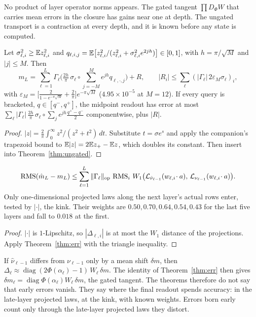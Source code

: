 No product of layer operator norms appears. The gated tangent $\prod D_\Phi W$ that carries mean errors in the closure
has gains near one at depth. The ungated transport is a contraction at every depth, and it is known before any state is
computed.

\begin{theorem}\label{thm:readout}
Let $\sigma_{\ell,i}^2\ge\mathbb{E} z_{\ell,i}^2$ and $q_{\ell,i,j}=\mathbb{E}\big[z_{\ell,i}^2/(z_{\ell,i}^2+\sigma_{\ell,i}^2e^{2jh})\big]
\in[0,1]$, with $h=\pi/\sqrt M$ and $|j|\le M$. Then
\[
m_L=\sum_{\ell=1}^L\Gamma_\ell\Big(\tfrac{2h}{\pi}\,\sigma_\ell\circ\sum_{j=-M}^Me^{jh}q_{\ell,\cdot,j}\Big)+R,\qquad
|R_i|\le\sum_\ell(|\Gamma_\ell|\,2\varepsilon_M\sigma_\ell)_i,
\]
with $\varepsilon_M=\big[\tfrac2{1-e^{-\pi\sqrt M}}+\tfrac2\pi\big]e^{-\pi\sqrt M}$ ($4.95\times10^{-5}$ at $M=12$). If every
query is bracketed, $q\in[q^-,q^+]$, the midpoint readout has error at most
$\sum_\ell|\Gamma_\ell|\,\frac{2h}{\pi}\,\sigma_\ell\circ\sum_je^{jh}\frac{q^+-q^-}2$ componentwise, plus $|R|$.
\end{theorem}
\begin{proof}
$|z|=\frac2\pi\int_0^\infty z^2/(z^2+t^2)\,dt$. Substitute $t=\sigma e^s$ and apply the companion's trapezoid bound to $\mathbb{E}|z|=2\mathbb{E}
z_+-\mathbb{E} z$, which doubles its constant. Then insert into Theorem~\ref{thm:ungated}.
\end{proof}

\begin{corollary}\label{cor:sliced}
\[
\operatorname{RMS}(\hat m_L-m_L)\le\sum_{\ell=1}^L\|\Gamma_\ell\|_{\rm op}\,\operatorname{RMS}_i\,
W_1\big(\mathcal L_{\hat\nu_{\ell-1}}(w_{\ell,i}\!\cdot a),\,\mathcal L_{\nu_{\ell-1}}(w_{\ell,i}\!\cdot a)\big).
\]
Only one-dimensional projected laws along the next layer's actual rows enter, tested by $|\cdot|$, the kink. Their weights
are $0.50, 0.70, 0.64, 0.54, 0.43$ for the last five layers and fall to $0.018$ at the first.
\end{corollary}
\begin{proof}
$|\cdot|$ is $1$-Lipschitz, so $|\Delta_{\ell,i}|$ is at most the $W_1$ distance of the projections. Apply
Theorem~\ref{thm:err} with the triangle inequality.
\end{proof}

\begin{remark}
If $\hat\nu_{\ell-1}$ differs from $\nu_{\ell-1}$ only by a mean shift $\delta m$, then
$\Delta_\ell\approx\operatorname{diag}(2\Phi(\alpha_\ell)-1)\,W_\ell\,\delta m$. The identity of Theorem~\ref{thm:err} then
gives $\delta m_\ell=\operatorname{diag}\Phi(\alpha_\ell)W_\ell\,\delta m$, the gated tangent. The theorems therefore do not
say that early errors vanish. They say where the final readout spends accuracy: in the late-layer projected laws, at the
kink, with known weights. Errors born early count only through the late-layer projected laws they distort.
\end{remark}

